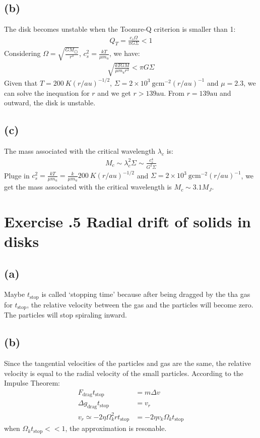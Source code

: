 \documentclass[a4paper,12pt]{article}
\newcommand{\cm}{\mathrm{cm}}
\newcommand{\g}{\mathrm{g}}
\begin{document}
\subsection*{(b)}
The disk becomes unstable when the Toomre-Q criterion is smaller than 1:
\begin{align*}
    Q_T = \frac{c_s \Omega}{\pi G \Sigma} < 1
\end{align*}
Considering $\Omega = \sqrt{\frac{GM_{\bigodot}}{r^3}}$, $c_s^2 = \frac{kT}{\mu m_u}$, 
we have:
\begin{align*}
    \sqrt{\frac{kT GM}{\mu m_u r^3}} < \pi G \Sigma
\end{align*}
Given that $T = 200 \ K (r/au)^{-1/2}$, $\Sigma = 2\times 10^3 \ \g \cm^{-2} (r/au)^{-1}$ and $\mu=2.3$, 
we can solve the inequation for $r$ and we get $r>139 \text{au}$. From $r=139 \text{au}$ and outward,
the disk is unstable.

\subsection*{(c)}
The mass associated with the critical wavelength $\lambda_c$ is:
\begin{align*}
    M_c \sim \lambda_c^2 \Sigma \sim \frac{c_s^4}{G^2\Sigma}
\end{align*}
Pluge in $c_s^2 = \frac{kT}{\mu m_u} = \frac{k}{\mu m_u} 200 \ K (r/au)^{-1/2}$ and $\Sigma = 2\times 10^3 \ \g \cm^{-2} (r/au)^{-1}$, 
we get the mass associated with the critical wavelength is $M_c \sim 3.1 M_J$.

\section*{\textbf{Exercise \uppercase\expandafter{}.5 Radial drift of solids in disks}}
\subsection*{(a)}
Maybe $t_\text{stop}$ is called `stopping time' because after being dragged by the tha gas for $t_\text{stop}$, 
the relative velocity between the gas and the particles will become zero. The particles will stop spiraling inward. 

\subsection*{(b)}
Since the tangential velocities of the particles and gas are the same, the relative velocity is equal to 
the radial velocity of the small particles. According to the Impulse Theorem:
\begin{align*}
    F_\text{drag} t_\text{stop} &= m \Delta v \\
    \Delta g_\text{drag} t_\text{stop} &= v_r \\
    v_r \simeq -2\eta \Omega_k^2 r  t_\text{stop} &= -2\eta v_k \Omega_k t_\text{stop}
\end{align*}
when $\Omega_k t_\text{stop} << 1$, the approximation is resonable.
\end{document}
